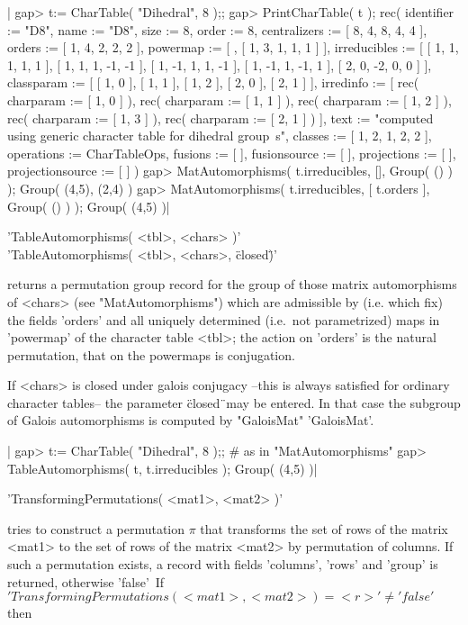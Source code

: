 |    gap> t:= CharTable( "Dihedral", 8 );;
    gap> PrintCharTable( t );
    rec( identifier := "D8", name := "D8", size := 8, order :=
    8, centralizers := [ 8, 4, 8, 4, 4 ], orders := [ 1, 4, 2, 2, 2
     ], powermap := [ , [ 1, 3, 1, 1, 1 ] ], irreducibles :=
    [ [ 1, 1, 1, 1, 1 ], [ 1, 1, 1, -1, -1 ], [ 1, -1, 1, 1, -1 ],
      [ 1, -1, 1, -1, 1 ], [ 2, 0, -2, 0, 0 ] ], classparam :=
    [ [ 1, 0 ], [ 1, 1 ], [ 1, 2 ], [ 2, 0 ], [ 2, 1 ] ], irredinfo :=
    [ rec(
          charparam := [ 1, 0 ] ), rec(
          charparam := [ 1, 1 ] ), rec(
          charparam := [ 1, 2 ] ), rec(
          charparam := [ 1, 3 ] ), rec(
          charparam := [ 2, 1 ] )
     ], text := "computed using generic character table for dihedral group\
    s", classes := [ 1, 2, 1, 2, 2
     ], operations := CharTableOps, fusions := [  ], fusionsource :=
    [  ], projections := [  ], projectionsource := [  ] )
    gap> MatAutomorphisms( t.irreducibles, [], Group( () ) );
    Group( (4,5), (2,4) )
    gap> MatAutomorphisms( t.irreducibles, [ t.orders ], Group( () ) );
    Group( (4,5) )|

\Section{TableAutomorphisms}%

'TableAutomorphisms( <tbl>, <chars> )'\\
'TableAutomorphisms( <tbl>, <chars>, \"closed\" )'

returns a permutation group record for the group of those matrix
automorphisms of <chars> (see "MatAutomorphisms") which are
admissible by (i.e. which fix) the fields 'orders' and all uniquely
determined (i.e.\ not parametrized) maps in 'powermap' of
the character table <tbl>; the action on 'orders' is the natural
permutation, that on the powermaps is conjugation.

If <chars> is closed under galois conjugacy --this is always satisfied
for ordinary character tables-- the parameter \"closed\"\ may be entered.
In that case the subgroup of Galois automorphisms is computed by
"GaloisMat" 'GaloisMat'.

|    gap> t:= CharTable( "Dihedral", 8 );; # as in "MatAutomorphisms"
    gap> TableAutomorphisms( t, t.irreducibles );
    Group( (4,5) )|

\Section{TransformingPermutations}

'TransformingPermutations( <mat1>, <mat2> )'

tries to construct a permutation $\pi$ that transforms the set of rows of
the matrix <mat1> to the set of rows of the matrix <mat2> by permutation
of columns.
If such a permutation exists, a record with fields 'columns', 'rows'
and 'group' is returned, otherwise 'false'\:\
If $'TransformingPermutations( <mat1>, <mat2> ) = <r>' \not= 'false'$
then

